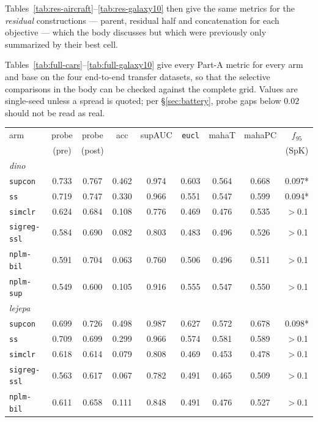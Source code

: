 \documentclass{article}
\begin{document}
Tables~\ref{tab:res-aircraft}--\ref{tab:res-galaxy10} then give the same
metrics for the \emph{residual} constructions --- parent, residual half and
concatenation for each objective --- which the body discusses but which were
previously only summarized by their best cell.

Tables~\ref{tab:full-cars}--\ref{tab:full-galaxy10} give every Part-A metric
for every arm and base on the four end-to-end transfer datasets, so that the
selective comparisons in the body can be checked against the complete grid.
Values are single-seed unless a spread is quoted; per \S\ref{sec:battery},
probe gaps below $0.02$ should not be read as real.

\begin{table}[p]\centering\small
\setlength{\tabcolsep}{4pt}
\begin{tabular}{lcccccccc}
\toprule
arm & probe & probe & acc & supAUC & \texttt{eucl} & mahaT & mahaPC & $f_{95}$ \\
    & (pre)  & (post) &     &        &               &       &        & (SpK) \\
\midrule
\multicolumn{9}{l}{\emph{dino}}\\
\texttt{supcon} & 0.733 & 0.767 & 0.462 & 0.974 & 0.603 & 0.564 & 0.668 & 0.097* \\
\texttt{ss} & 0.719 & 0.747 & 0.330 & 0.966 & 0.551 & 0.547 & 0.599 & 0.094* \\
\texttt{simclr} & 0.624 & 0.684 & 0.108 & 0.776 & 0.469 & 0.476 & 0.535 & $>$0.1 \\
\texttt{sigreg-ssl} & 0.584 & 0.690 & 0.082 & 0.803 & 0.483 & 0.496 & 0.526 & $>$0.1 \\
\texttt{nplm-bil} & 0.591 & 0.704 & 0.063 & 0.760 & 0.506 & 0.496 & 0.511 & $>$0.1 \\
\texttt{nplm-sup} & 0.549 & 0.600 & 0.105 & 0.916 & 0.555 & 0.547 & 0.550 & $>$0.1 \\
\multicolumn{9}{l}{\emph{lejepa}}\\
\texttt{supcon} & 0.699 & 0.726 & 0.498 & 0.987 & 0.627 & 0.572 & 0.678 & 0.098* \\
\texttt{ss} & 0.709 & 0.699 & 0.299 & 0.966 & 0.574 & 0.581 & 0.589 & $>$0.1 \\
\texttt{simclr} & 0.618 & 0.614 & 0.079 & 0.808 & 0.469 & 0.453 & 0.478 & $>$0.1 \\
\texttt{sigreg-ssl} & 0.563 & 0.617 & 0.067 & 0.782 & 0.491 & 0.465 & 0.509 & $>$0.1 \\
\texttt{nplm-bil} & 0.611 & 0.658 & 0.111 & 0.848 & 0.491 & 0.476 & 0.527 & $>$0.1 \\

\end{tabular}
\end{table}
\end{document}
